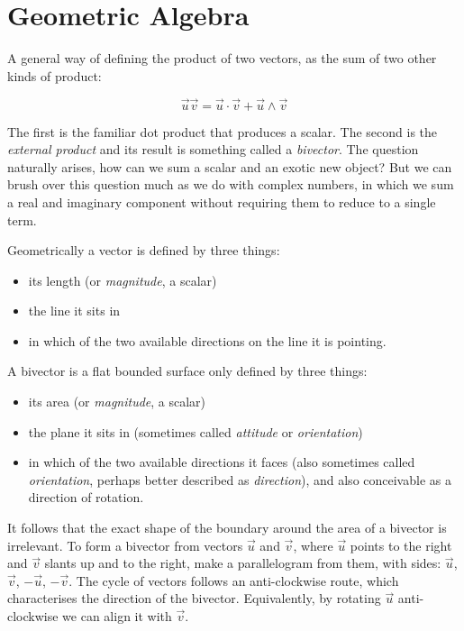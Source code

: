 \chapter{Geometric Algebra}

A general way of defining the product of two vectors, as the sum of two other kinds of product:

$$
\vec{u}\vec{v}
=
\vec{u} \cdot
\vec{v}
+
\vec{u}
\wedge
\vec{v}
$$

The first is the familiar dot product that produces a scalar. The second is the \textit{external product} and its result is something called a \textit{bivector}. The question naturally arises, how can we sum a scalar and an exotic new object? But we can brush over this question much as we do with complex numbers, in which we sum a real and imaginary component without requiring them to reduce to a single term.

Geometrically a vector is defined by three things:

\begin{itemize}
  \item its length (or \textit{magnitude}, a scalar)
  \item the line it sits in
  \item in which of the two available directions on the line it is pointing.
\end{itemize}

A bivector is a flat bounded surface only defined by three things:

\begin{itemize}
  \item its area (or \textit{magnitude}, a scalar)
  \item the plane it sits in (sometimes called \textit{attitude} or \textit{orientation})
  \item in which of the two available directions it faces (also sometimes called \textit{orientation}, perhaps better described as \textit{direction}), and also conceivable as a direction of rotation.
\end{itemize}

It follows that the exact shape of the boundary around the area of a bivector is irrelevant. To form a bivector from vectors $\vec{u}$ and $\vec{v}$, where $\vec{u}$ points to the right and $\vec{v}$ slants up and to the right, make a parallelogram from them, with sides: $\vec{u}$, $\vec{v}$, $-\vec{u}$, $-\vec{v}$. The cycle of vectors follows an anti-clockwise route, which characterises the direction of the bivector. Equivalently, by rotating $\vec{u}$ anti-clockwise we can align it with $\vec{v}$.

